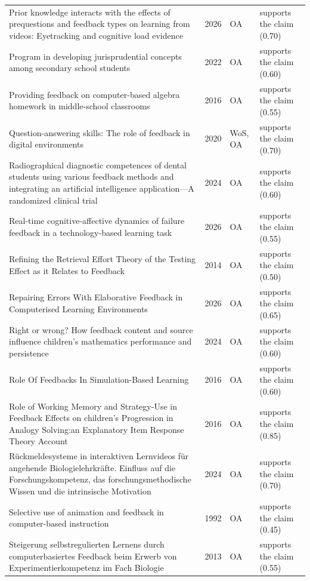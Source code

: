 \begin{longtable}{@{}%
  >{\raggedright\arraybackslash}p{}c%
  >{\raggedright\arraybackslash}p{}%
  >{\raggedright\arraybackslash}p{}@{}}
Prior knowledge interacts with the effects of prequestions and feedback types on learning from videos: Eyetracking and cognitive load evidence & 2026 & OA & supports the claim (0.70) \\
Program in developing jurisprudential concepts among secondary school students & 2022 & OA & supports the claim (0.60) \\
Providing feedback on computer-based algebra homework in middle-school classrooms & 2016 & OA & supports the claim (0.55) \\
Question-answering skills: The role of feedback in digital environments & 2020 & WoS, OA & supports the claim (0.70) \\
Radiographical diagnostic competences of dental students using various feedback methods and integrating an artificial intelligence application---A randomized clinical trial & 2024 & OA & supports the claim (0.60) \\
Real-time cognitive-affective dynamics of failure feedback in a technology-based learning task & 2026 & OA & supports the claim (0.55) \\
Refining the Retrieval Effort Theory of the Testing Effect as it Relates to Feedback & 2014 & OA & supports the claim (0.50) \\
Repairing Errors With Elaborative Feedback in Computerised Learning Environments & 2026 & OA & supports the claim (0.65) \\
Right or wrong? How feedback content and source influence children's mathematics performance and persistence & 2024 & OA & supports the claim (0.60) \\
Role Of Feedbacks In Simulation-Based Learning & 2016 & OA & supports the claim (0.60) \\
Role of Working Memory and Strategy-Use in Feedback Effects on children's Progression in Analogy Solving:an Explanatory Item Response Theory Account & 2016 & OA & supports the claim (0.85) \\
Rückmeldesysteme in interaktiven Lernvideos für angehende Biologielehrkräfte. Einfluss auf die Forschungskompetenz, das forschungsmethodische Wissen und die intrinsische Motivation & 2024 & OA & supports the claim (0.70) \\
Selective use of animation and feedback in computer-based instruction & 1992 & OA & supports the claim (0.45) \\
Steigerung selbstregulierten Lernens durch computerbasiertes Feedback beim Erwerb von Experimentierkompetenz im Fach Biologie & 2013 & OA & supports the claim (0.55) \\

\end{longtable}
